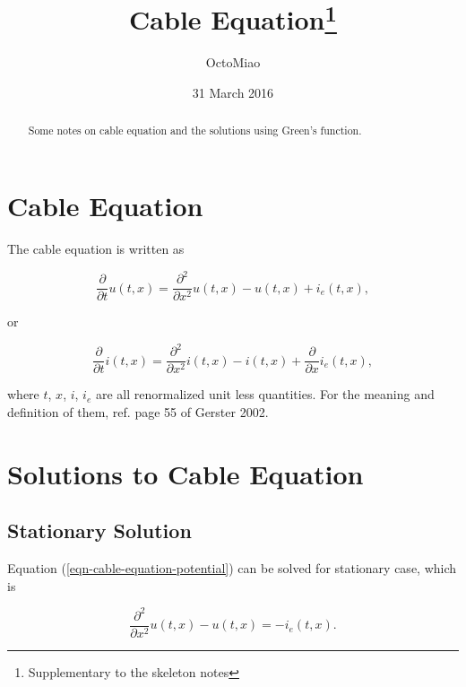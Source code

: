 \documentclass{tufte-handout}
\title{Cable Equation\thanks{Supplementary to the skeleton notes}}
\author[OctoMiao]{OctoMiao}
\date{31 March 2016}  %
\begin{document}
\maketitle%


\begin{abstract}
\noindent Some notes on cable equation and the solutions using Green's function.
\end{abstract}


\tableofcontents

\section{Cable Equation}


The cable equation is written as \cite{Gerstner2002}

\begin{equation}
    \frac{\partial}{\partial t} u(t,x) = \frac{\partial^2}{\partial x^2} u(t,x) - u(t,x) + i_{e}(t,x), \label{eqn-cable-equation-potential}
\end{equation}

or

\begin{equation}
    \frac{\partial}{\partial t} i(t,x) = \frac{\partial^2}{\partial x^2} i(t,x) - i(t,x) + \frac{\partial}{\partial x} i_e (t,x),\label{eqn-cable-equation-current}
\end{equation}

where $t$, $x$, $i$, $i_e$ are all renormalized unit less quantities. For the meaning and definition of them, ref. page 55 of Gerster 2002\cite{Gerstner2002}.



\section{Solutions to Cable Equation}


\subsection{Stationary Solution}

Equation (\ref{eqn-cable-equation-potential}) can be solved for stationary case, which is

\begin{equation}
     \frac{\partial^2}{\partial x^2} u(t,x) - u(t,x) =- i_{e}(t,x) .\label{eqn-cable-equation-stationary-equation-potential}
\end{equation}
\end{document}
